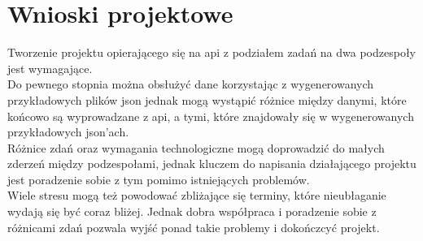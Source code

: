 \documentclass{article}
\begin{document}
\section{Wnioski projektowe}

Tworzenie projektu opierającego się na api z podziałem zadań na dwa podzespoły jest wymagające.\\ 
Do pewnego stopnia można obsłużyć dane korzystając z wygenerowanych przykładowych plików json jednak mogą wystąpić różnice między danymi, które końcowo są wyprowadzane z api, a tymi, które znajdowały się w wygenerowanych przykładowych json'ach.\\
Różnice zdań oraz wymagania technologiczne mogą doprowadzić do małych zderzeń między podzespołami, jednak kluczem do napisania działającego projektu jest poradzenie sobie z tym pomimo istniejących problemów.\\
Wiele stresu mogą też powodować zbliżające się terminy, które nieubłaganie wydają się być coraz bliżej. Jednak dobra współpraca i poradzenie sobie z różnicami zdań pozwala wyjść ponad takie problemy i dokończcyć projekt.
\end{document}
